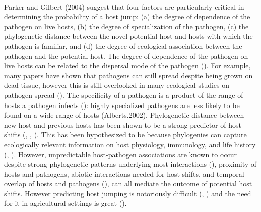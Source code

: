 \documentclass[12pt,letter]{article}
\begin{document}
\paragraph{}Parker and Gilbert (2004\cite{Parker2015}) suggest that four factors are particularly critical in determining the probability of a host jump: (a) the degree of dependence of the pathogen on live hosts, (b) the degree of specialization of the pathogen, (c) the phylogenetic distance between the novel potential host and hosts with which the pathogen is familiar, and (d) the degree of ecological association between the pathogen and the potential host. The degree of dependence of the pathogen on live hosts can be related to the dispersal mode of the pathogen (\cite{Roy2001}). For example, many papers have shown that pathogens can still spread despite being grown on dead tissue, however this is still overlooked in many ecological studies on pathogen spread (\cite{Parker2015}). The specificity of a pathogen is a product of the range of hosts a pathogen infects (\cite{Parker2015}): highly specialized pathogens are less likely to be found on a wide range of hosts (Alberts.2002). Phylogenetic distance between new host and previous hosts has been shown to be a strong predictor of host shifts (\cite{Farr2002}, \cite{Leebens-Mack2006}, \cite{Duncan2002}). This has been hypothesized to be because phylogenies can capture ecologically relevant information on host physiology, immunology, and life history (\cite{Davies2008}, \cite{Gilbert2007}). However, unpredictable host-pathogen associations are known to occur despite strong phylogenetic patterns underlying most interactions (\cite{Biology1987}), proximity of hosts and pathogens, abiotic interactions needed for host shifts, and temporal overlap of hosts and pathogens (\cite{Parker2015}), can all mediate the outcome of potential host shifts. However predicting host jumping is notoriously difficult (\cite{Sicard2018}, \cite{Geoghegan2017}) and the need for it in agricultural settings is great (\cite{McDonald2016}).
\end{document}
